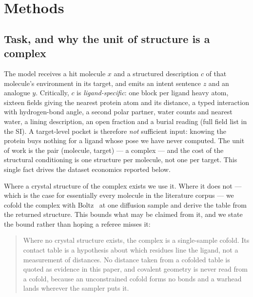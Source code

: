 \section{Methods}

\subsection{Task, and why the unit of structure is a complex}

The model receives a hit molecule $x$ and a structured description $c$ of that molecule's
environment in its target, and emits an intent sentence $z$ and an analogue $y$. Critically, $c$ is
\emph{ligand-specific}: one block per ligand heavy atom, sixteen fields giving the nearest protein
atom and its distance, a typed interaction with hydrogen-bond angle, a second polar partner, water
counts and nearest water, a lining description, an open fraction and a burial reading (full field
list in the SI). A target-level pocket is therefore \emph{not} sufficient input: knowing the protein
buys nothing for a ligand whose pose we have never computed. The unit of work is the pair (molecule, target) --- a
complex --- and the cost of the structural conditioning is one structure per molecule, not one per
target. This single fact drives the dataset economics reported below.

Where a crystal structure of the complex exists we use it. Where it does not --- which is the case
for essentially every molecule in the literature corpus --- we cofold the complex with
Boltz~\citep{wohlwend2024boltz1,passaro2025boltz2} at one diffusion sample and derive the table from
the returned structure. This bounds what may be claimed from it, and we state the bound rather than
hoping a referee misses it:

\begin{quote}
Where no crystal structure exists, the complex is a single-sample cofold. Its contact table is a
hypothesis about which residues line the ligand, not a measurement of distances. No distance taken
from a cofolded table is quoted as evidence in this paper, and covalent geometry is never read from
a cofold, because an unconstrained cofold forms no bonds and a warhead lands wherever the sampler
puts it.
\end{quote}

